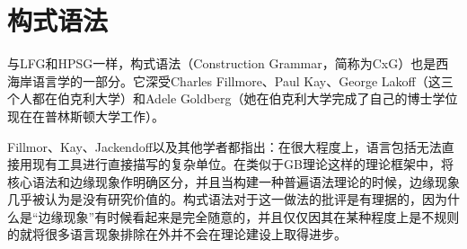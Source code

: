 
\chapter{构式语法}
\label{Kapitel-CxG}

%
%
%
%

与LFG和HPSG一样，构式语法（Construction Grammar，简称为CxG）也是西海岸语言学的一部分。它深受Charles Fillmore、Paul Kay、George Lakoff（这三个人都在伯克利大学）和Adele Goldberg（她在伯克利大学完成了自己的博士学位现在在普林斯顿大学工作）\citep*{Fillmore88a,FKoC88a,KF99a,Kay2002a,Kay2005a,Goldberg95a,Goldberg2006a}。

Fillmor、Kay、Jackendoff以及其他学者都指出：在很大程度上，语言包括无法直接用现有工具进行直接描写的复杂单位。在类似于GB理论这样的理论框架中，将核心语法和边缘现象作明确区分\citep[]{Chomsky81a}，并且当构建一种普遍语法理论的时候，边缘现象几乎被认为是没有研究价值的。构式语法对于这一做法的批评是有理据的，因为什么是“边缘现象”有时候看起来是完全随意的\citep{MuellerKernigkeit}，并且仅仅因其在某种程度上是不规则的就将很多语言现象排除在外并不会在理论建设上取得进步。

